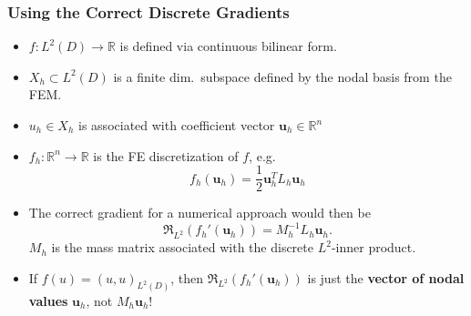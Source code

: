 \documentclass[aspectratio=169,xcolor=dvipsnames,10pt]{beamer}
\begin{document}
\begin{frame}\frametitle{Using the Correct Discrete Gradients}
\vspace{-2ex}
\begin{example}[]
\begin{itemize}
\item
$f : L^2(D) \to \mathbb R$  is defined via continuous bilinear form.
\item 
$X_h \subset L^2(D)$ is a finite dim.\ subspace defined by the nodal basis from the FEM. 
\item 
$u_h \in X_h$ is associated with coefficient vector $\mathbf{u}_h \in \mathbb R^n$ \pause
\item 
$f_h : \mathbb R^n \to \mathbb R$ is the FE discretization of $f$, e.g.
\[
f_h(\mathbf{u}_h) = \frac{1}{2} \mathbf{u}^T_h L_h \mathbf{u}_h
\]
\item The correct gradient for a numerical approach would then be
\[
\mathfrak{R}_{L^2}(f_h'(\mathbf{u}_h)) = M_h^{-1} L_h \mathbf{u}_h.
\]
$M_h$ is the mass matrix associated with the discrete $L^2$-inner product.
\item If $f(u) = (u,u)_{L^2(D)}$, then $\mathfrak{R}_{L^2}(f_h'(\mathbf{u}_h))$ is just the \textbf{vector of nodal values} $\bm u_h$, \alert{not} $M_h \bm u_h$!
\end{itemize}
\end{example}
\end{frame}
\end{document}
